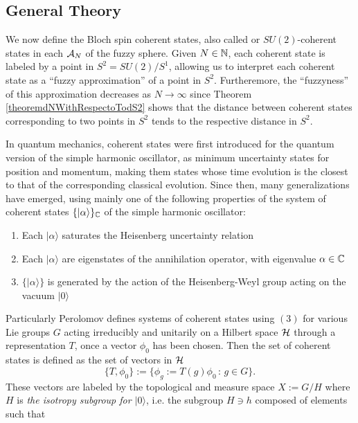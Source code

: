 \subsection{General Theory}

We now define the Bloch spin coherent states, also called or $SU(2)$-coherent states in each $\mathcal A_N$ of the fuzzy sphere. Given $N \in \mathbb{N}$, each coherent state is labeled by a point in $S^2 = SU(2) / S^1$, allowing us to interpret each coherent state as a ``fuzzy approximation'' of a point in $S^2$. Furtheremore, the ``fuzzyness'' of this approximation decreases as $N \to \infty$ since Theorem \ref{theoremdNWithRespectoTodS2} shows that the distance between coherent states corresponding to two points in $S^2$ tends to the respective distance in $S^2$.

In quantum mechanics, coherent states were first introduced for the quantum version of the simple harmonic oscillator, as minimum uncertainty states for position and momentum, making them states whose time evolution is the closest to that of the corresponding classical evolution. Since then, many generalizations have emerged, using mainly one of the following properties of the system of coherent states $\{|\alpha\rangle\}_{\mathbb{C}}$ of the simple harmonic oscillator:
    \begin{enumerate}
        
    \item Each $|\alpha\rangle$ saturates the Heisenberg uncertainty relation
    
    \item Each $|\alpha\rangle$ are eigenstates of the annihilation operator, with eigenvalue $\alpha \in \mathbb{C}$
    
    \item $\{|\alpha\rangle\}$ is generated by the action of the Heisenberg-Weyl group acting on the vacuum $|0\rangle$
        
    \end{enumerate}
Particularly Perolomov \cite{Perelomov} defines systems of coherent states using $(3)$ for various Lie groups $G$ acting irreducibly and unitarily on a Hilbert space $\mathcal H$ through a representation $T$, once a vector $\phi_0$ has been chosen. Then the set of coherent states is defined as the set of vectors in $\mathcal H$ 
\begin{equation}
    \{ T, \phi_0\} := \{\phi_g := T(g) \phi_0 \,:\, g \in G\}.
\end{equation}
These vectors are labeled by the topological and measure space $X := G/H$ where $H$ is \emph{the isotropy subgroup for $|0\rangle$}, i.e. the subgroup $H \ni h$ composed of elements such that
